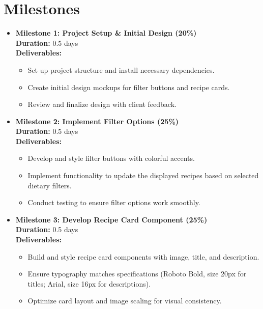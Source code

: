 \documentclass{article}
\begin{document}
\section*{Milestones}

\begin{itemize}
    \item \textbf{Milestone 1: Project Setup \& Initial Design (20\%)} \\
    \textbf{Duration:} 0.5 days \\
    \textbf{Deliverables:}
    \begin{itemize}
        \item Set up project structure and install necessary dependencies.
        \item Create initial design mockups for filter buttons and recipe cards.
        \item Review and finalize design with client feedback.
    \end{itemize}

    \item \textbf{Milestone 2: Implement Filter Options (25\%)} \\
    \textbf{Duration:} 0.5 days \\
    \textbf{Deliverables:}
    \begin{itemize}
        \item Develop and style filter buttons with colorful accents.
        \item Implement functionality to update the displayed recipes based on selected dietary filters.
        \item Conduct testing to ensure filter options work smoothly.
    \end{itemize}

    \item \textbf{Milestone 3: Develop Recipe Card Component (25\%)} \\
    \textbf{Duration:} 0.5 days \\
    \textbf{Deliverables:}
    \begin{itemize}
        \item Build and style recipe card components with image, title, and description.
        \item Ensure typography matches specifications (Roboto Bold, size 20px for titles; Arial, size 16px for descriptions).
        \item Optimize card layout and image scaling for visual consistency.
    \end{itemize}


\end{itemize}
\end{document}
